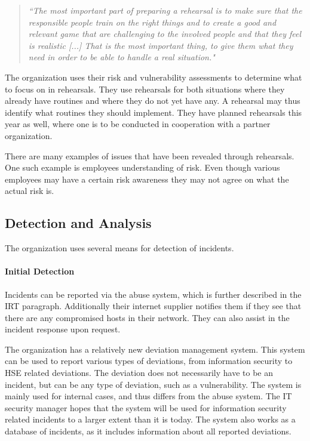 \begin{quote}
\textit{``The most important part of preparing a rehearsal is to make sure that the responsible people train on the right things and to create a good and relevant game that are challenging to the involved people and that they feel is realistic [...] That is the most important thing, to give them what they need in order to be able to handle a real situation."}
\end{quote}

The organization uses their risk and vulnerability assessments to determine what to focus on in rehearsals. They use rehearsals for both situations where they already have routines and where they do not yet have any. A rehearsal may thus identify what routines they should implement. They have planned rehearsals this year as well, where one is to be conducted in cooperation with a partner organization. %

There are many examples of issues that have been revealed through rehearsals. One such example is employees understanding of risk. Even though various employees may have a certain risk awareness they may not agree on what the actual risk is. 

\subsection{Detection and Analysis}
The organization uses several means for detection of incidents.

\paragraph{Initial Detection}
Incidents can be reported via the abuse system, which is further described in the \ac{IRT} paragraph. Additionally their internet supplier notifies them if they see that there are any compromised hosts in their network. They can also assist in the incident response upon request.

The organization has a relatively new deviation management system. This system can be used to report various types of deviations, from information security to \ac{HSE} related deviations. The deviation does not necessarily have to be an incident, but can be any type of deviation, such as a vulnerability. The system is mainly used for internal cases, and thus differs from the abuse system. The IT security manager hopes that the system will be used for information security related incidents to a larger extent than it is today. The system also works as a database of incidents, as it includes information about all reported deviations.  

